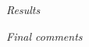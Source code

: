 \documentclass[]{beamer} %
\begin{document}


 








 

\begin{frame}{}
  \centering \Huge
  \emph{Results}

\end{frame}

\begin{frame}{}
  \centering \Huge
  \emph{Final comments}

\end{frame}
\end{document}
